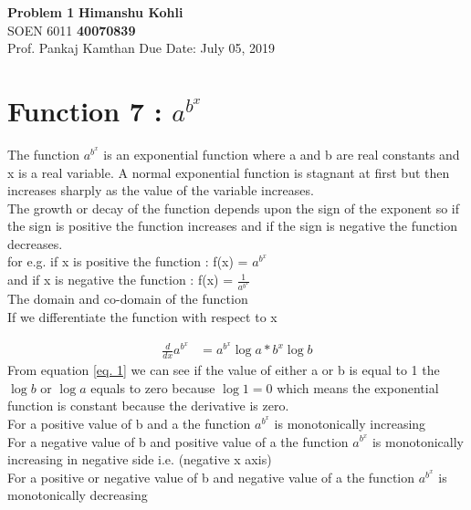 \documentclass[a4paper, 11pt]{article}
\begin{document}
\noindent
\large\textbf{Problem 1} \hfill \textbf{Himanshu Kohli} \\
\normalsize SOEN 6011 \hfill \textbf{40070839} \\
Prof. Pankaj Kamthan \hfill Due Date: July 05, 2019 \\


\section{Function 7 :  $a^{b^{x}}$}

The function $a^{b^{x}}$ is an exponential function where a and b are real constants and x is a real variable. A normal exponential function is stagnant at first but then increases sharply as the value of the variable increases. \\

The growth or decay of the function depends upon the sign of the exponent so if the sign is positive the function increases and if the sign is negative the function decreases.\\

for e.g. if x is positive the function : f(x) = $a^{b^{x}}$ \\

and if x is negative the function : f(x) = $\frac{1}{a^{b^{x}}}$ \\

The domain and co-domain of the function \\

If we differentiate the function with respect to x

\begin{equation} \label{eq. 1}
    \begin{split}
        \frac{d}{dx}  a^{b^{x}} & = a^{b^{x}} \log{a} * b^x \log{b}
    \end{split}
\end{equation} 
\newline
From equation \ref{eq. 1} we can see if the value of either a or b is equal to 1 the $\log{b}$ or $\log{a}$ equals to zero because $\log{1} = 0$ which means the exponential function is constant because the derivative is zero. \\
For a positive value of b and a the function $a^{b^{x}}$ is monotonically increasing \\
For a negative value of b and positive value of a the function $a^{b^{x}}$ is monotonically increasing in negative side i.e. (negative x axis)  \\
For a positive or negative value of b and negative value of a the function $a^{b^{x}}$ is monotonically decreasing  \\
\end{document}
